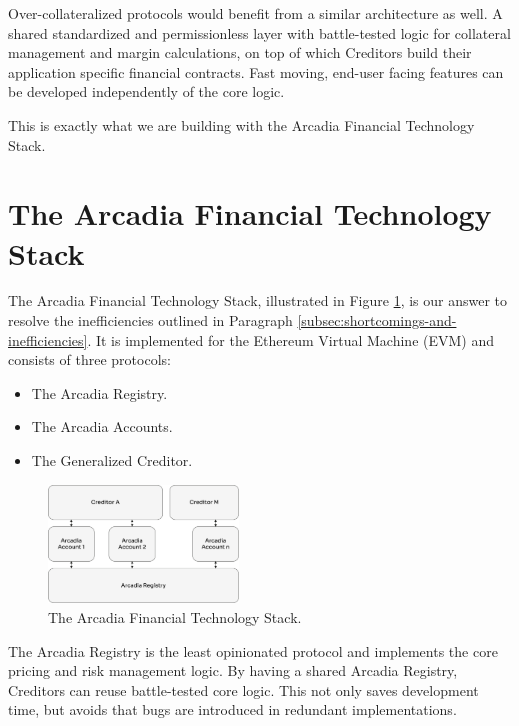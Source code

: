 \documentclass[sigconf,nonacm]{acmart}
\begin{document}
Over-collateralized protocols would benefit from a similar architecture as well.
A shared standardized and permissionless layer with battle-tested logic for collateral management and margin calculations,
on top of which Creditors build their application specific financial contracts.
Fast moving, end-user facing features can be developed independently of the core logic.

This is exactly what we are building with the Arcadia Financial Technology Stack.

\section{The Arcadia Financial Technology Stack}
\label{sec:arcadia-financial-technology-stack}

The Arcadia Financial Technology Stack, illustrated in Figure \ref{fig:arcadia-financial-technology-stack},
is our answer to resolve the inefficiencies outlined in Paragraph \ref{subsec:shortcomings-and-inefficiencies}.
It is implemented for the Ethereum Virtual Machine (EVM) and consists of three protocols:

\begin{samepage}
    \begin{itemize}
        \item The Arcadia Registry.
        \item The Arcadia Accounts.
        \item The Generalized Creditor.
    \end{itemize}
\end{samepage}

\begin{figure}
    \centering
    \includegraphics[width=0.45\textwidth]{images/Arcadia-Financial-Technology-Stack.png}
    \caption{The Arcadia Financial Technology Stack. \label{fig:arcadia-financial-technology-stack}}
\end{figure}

The Arcadia Registry is the least opinionated protocol and implements the core pricing and risk management logic.
By having a shared Arcadia Registry, Creditors can reuse battle-tested core logic.
This not only saves development time, but avoids that bugs are introduced in redundant implementations.
\end{document}

